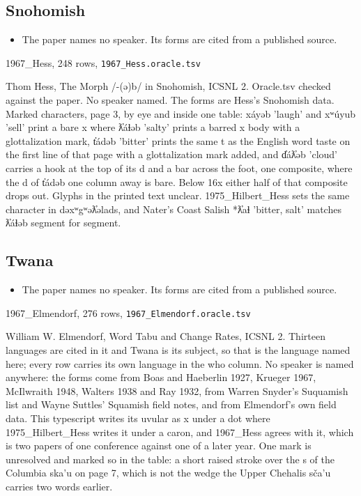 \subsection{Snohomish}

\begin{itemize}
\item The paper names no speaker. Its forms are cited from a published source.
\end{itemize}

1967\_Hess, 248 rows, \texttt{1967\_\allowbreak{}Hess.\allowbreak{}oracle.\allowbreak{}tsv}

Thom Hess, The Morph /-(ə)b/ in Snohomish, ICSNL 2. Oracle.tsv checked against the paper. No speaker named. The forms are Hess's Snohomish data. Marked characters, page 3, by eye and inside one table: xáyəb 'laugh' and xʷúyub 'sell' print a bare x where ƛ̓áɬəb 'salty' prints a barred x body with a glottalization mark, t̓ádəb 'bitter' prints the same t as the English word taste on the first line of that page with a glottalization mark added, and d̓áƛ̓əb 'cloud' carries a hook at the top of its d and a bar across the foot, one composite, where the d of t̓ádəb one column away is bare. Below 16x either half of that composite drops out. Glyphs in the printed text unclear. 1975\_Hilbert\_Hess sets the same character in dəxʷgʷəƛ̓əlads, and Nater's Coast Salish *ƛ̓aɬ 'bitter, salt' matches ƛ̓áɬəb segment for segment.

\subsection{Twana}

\begin{itemize}
\item The paper names no speaker. Its forms are cited from a published source.
\end{itemize}

1967\_Elmendorf, 276 rows, \texttt{1967\_\allowbreak{}Elmendorf.\allowbreak{}oracle.\allowbreak{}tsv}

William W. Elmendorf, Word Tabu and Change Rates, ICSNL 2. Thirteen languages are cited in it and Twana is its subject, so that is the language named here; every row carries its own language in the who column. No speaker is named anywhere: the forms come from Boas and Haeberlin 1927, Krueger 1967, McIlwraith 1948, Walters 1938 and Ray 1932, from Warren Snyder's Suquamish list and Wayne Suttles' Squamish field notes, and from Elmendorf's own field data. This typescript writes its uvular as x under a dot where 1975\_Hilbert\_Hess writes it under a caron, and 1967\_Hess agrees with it, which is two papers of one conference against one of a later year. One mark is unresolved and marked so in the table: a short raised stroke over the s of the Columbia ska'u on page 7, which is not the wedge the Upper Chehalis sča'u carries two words earlier.

